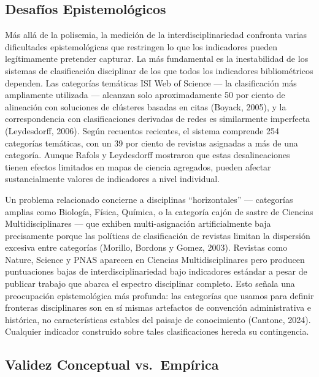 \documentclass[
]{article}
\begin{document}
\hypertarget{desafuxedos-epistemoluxf3gicos}{%
\subsection{Desafíos
Epistemológicos}\label{desafuxedos-epistemoluxf3gicos}}

Más allá de la polisemia, la medición de la interdisciplinariedad
confronta varias dificultades epistemológicas que restringen lo que los
indicadores pueden legítimamente pretender capturar. La más fundamental
es la inestabilidad de los sistemas de clasificación disciplinar de los
que todos los indicadores bibliométricos dependen. Las categorías
temáticas ISI Web of Science --- la clasificación más ampliamente
utilizada --- alcanzan solo aproximadamente 50 por ciento de alineación
con soluciones de clústeres basadas en citas (Boyack, 2005), y la
correspondencia con clasificaciones derivadas de redes es similarmente
imperfecta (Leydesdorff, 2006). Según recuentos recientes, el sistema
comprende 254 categorías temáticas, con un 39 por ciento de revistas
asignadas a más de una categoría. Aunque Rafols y Leydesdorff mostraron
que estas desalineaciones tienen efectos limitados en mapas de ciencia
agregados, pueden afectar sustancialmente valores de indicadores a nivel
individual.

Un problema relacionado concierne a disciplinas ``horizontales'' ---
categorías amplias como Biología, Física, Química, o la categoría cajón
de sastre de Ciencias Multidisciplinares --- que exhiben
multi-asignación artificialmente baja precisamente porque las políticas
de clasificación de revistas limitan la dispersión excesiva entre
categorías (Morillo, Bordons y Gomez, 2003). Revistas como Nature,
Science y PNAS aparecen en Ciencias Multidisciplinares pero producen
puntuaciones bajas de interdisciplinariedad bajo indicadores estándar a
pesar de publicar trabajo que abarca el espectro disciplinar completo.
Esto señala una preocupación epistemológica más profunda: las categorías
que usamos para definir fronteras disciplinares son en sí mismas
artefactos de convención administrativa e histórica, no características
estables del paisaje de conocimiento (Cantone, 2024). Cualquier
indicador construido sobre tales clasificaciones hereda su contingencia.

\hypertarget{validez-conceptual-vs.-empuxedrica}{%
\subsection{Validez Conceptual
vs.~Empírica}\label{validez-conceptual-vs.-empuxedrica}}
\end{document}
